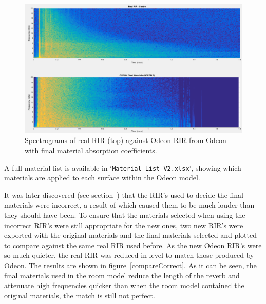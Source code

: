 \documentclass[../../main.tex]{subfiles}
\begin{document}
			\begin{figure}[H]
				\centerline{\includegraphics[scale = 0.3]{Sections/Implementation/Odeon/images/MaterialCompare/OriginalMaterials/new.png}}
				\caption{Spectrograms of real \ac{RIR} (top) against Odeon \ac{RIR} from Odeon with final material absorption coefficients.}
				\label{compareNew}
			\end{figure}

			A full material list is available in `\texttt{Material\_List\_V2.xlsx}', showing which materials are applied to each surface within the Odeon model.

			It was later discovered (see section~) that the \ac{RIR}'s used to decide the final materials were incorrect, a result of which caused them to be much louder than they should have been. To ensure that the materials selected when using the incorrect \ac{RIR}'s were still appropriate for the new ones, two new \ac{RIR}'s were exported with the original materials and the final materials selected and plotted to compare against the same real \ac{RIR} used before. As the new Odeon \ac{RIR}'s were so much quieter, the real \ac{RIR} was reduced in level to match those produced by Odeon. The results are shown in figure~\ref{compareCorrect}. As it can be seen, the final materials used in the room model reduce the length of the reverb and attenuate high frequencies quicker than when the room model contained the original materials, the match is still not perfect.  
\end{document}
